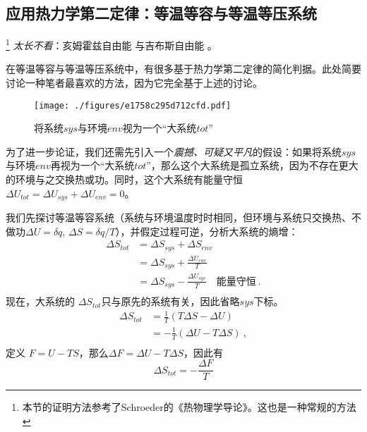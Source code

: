 \subsection{应用热力学第二定律：等温等容与等温等压系统}
\footnote{本节的证明方法参考了Schroeder的《热物理学导论》。这也是一种常规的方法} 
\textsl{太长不看}：亥姆霍兹自由能 与吉布斯自由能 。

在等温等容与等温等压系统中，有很多基于热力学第二定律的简化判据。此处简要讨论一种笔者最喜欢的方法，因为它完全基于上述的讨论。

\begin{figure}[ht]
\centering
\texttt{[image: ./figures/e1758c295d712cfd.pdf]}
\caption{将系统$sys$与环境$env$视为一个“大系统$tot$”} \label{fig_Td2Law_3}
\end{figure}

为了进一步论证，我们还需先引入一个\textsl{震撼、可疑又平凡}的假设：如果将系统$sys$与环境$env$再视为一个“大系统$tot$”，那么这个大系统是孤立系统，因为不存在更大的环境与之交换热或功。同时，这个大系统有能量守恒 $\Delta U_{tot} = \Delta U_{sys} + \Delta U_{env} = 0$。

我们先探讨等温等容系统（系统与环境温度时时相同，但环境与系统只交换热、不做功$\Delta U = \delta q$, $\Delta S = \delta q / T$），并假定过程可逆，分析大系统的熵增：
\begin{equation}
\begin{aligned}
\Delta {S_{tot}}
 &=\Delta {S_{sys}}+\Delta {S_{env}}\\
 & =\Delta {S_{sys}}+ \frac{\Delta U_{{env}}}{T}\\
 & = \Delta {S_{sys}} - \frac{\Delta U_{{sys}}}{T} \quad \text{能量守恒}~.\\
 \end{aligned}
\end{equation}
现在，大系统的 $\Delta {S_{tot}}$只与原先的系统有关，因此省略$sys$下标。
\begin{equation}
\begin{aligned}
\Delta {S_{tot}}
 & = \frac{1}{T}(T \Delta {S} -\Delta U )\\
 & = - \frac{1}{T}(\Delta U - T \Delta {S} )~,\\
\end{aligned}
\end{equation}
定义 $F = U-TS$，那么$\Delta F = \Delta U - T \Delta S$，因此有
\begin{equation}
\Delta S_{tot} = -\frac{\Delta F}{T}
\end{equation}

